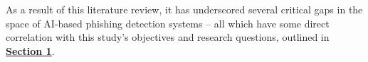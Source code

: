 
As a result of this literature review, it has underscored several critical gaps in the space of AI-based phishing detection systems -- all which have some direct correlation with this study's objectives and research questions, outlined in \hyperref[sec:1-introduction]{\uline{\textbf{Section 1}}}.

